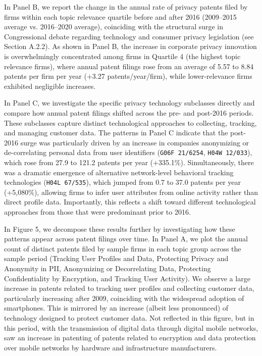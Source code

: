 \documentclass[11pt]{article}
\begin{document}
In Panel B, we report the change in the annual rate of privacy patents filed by firms within each topic relevance quartile before and after 2016 (2009--2015 average vs. 2016--2020 average), coinciding with the structural surge in Congressional debate regarding technology and consumer privacy legislation (see Section A.2.2). As shown in Panel B, the increase in corporate privacy innovation is overwhelmingly concentrated among firms in Quartile 4 (the highest topic relevance firms), where annual patent filings rose from an average of 5.57 to 8.84 patents per firm per year (+3.27 patents/year/firm), while lower-relevance firms exhibited negligible increases.

In Panel C, we investigate the specific privacy technology subclasses directly and compare how annual patent filings shifted across the pre- and post-2016 periods. These subclasses capture distinct technological approaches to collecting, tracking, and managing customer data. The patterns in Panel C indicate that the post-2016 surge was particularly driven by an increase in companies anonymizing or de-correlating personal data from user identifiers (\texttt{G06F 21/6254}, \texttt{H04W 12/033}), which rose from 27.9 to 121.2 patents per year (+335.1\%). Simultaneously, there was a dramatic emergence of alternative network-level behavioral tracking technologies (\texttt{H04L 67/535}), which jumped from 0.7 to 37.0 patents per year (+5,080\%), allowing firms to infer user attributes from online activity rather than direct profile data. Importantly, this reflects a shift toward different technological approaches from those that were predominant prior to 2016.

In Figure 5, we decompose these results further by investigating how these patterns appear across patent filings over time. In Panel A, we plot the annual count of distinct patents filed by sample firms in each topic group across the sample period (Tracking User Profiles and Data, Protecting Privacy and Anonymity in PII, Anonymizing or Decorrelating Data, Protecting Confidentiality by Encryption, and Tracking User Activity). We observe a large increase in patents related to tracking user profiles and collecting customer data, particularly increasing after 2009, coinciding with the widespread adoption of smartphones. This is mirrored by an increase (albeit less pronounced) of technology designed to protect customer data. Not reflected in this figure, but in this period, with the transmission of digital data through digital mobile networks, saw an increase in patenting of patents related to encryption and data protection over mobile networks by hardware and infrastructure manufacturers.
\end{document}

